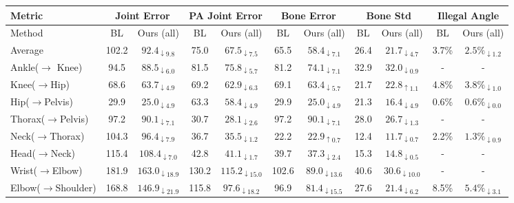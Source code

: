 \documentclass[10pt,twocolumn,letterpaper]{article}
\begin{document}
\begin{table*} 
\centering
\small
\begin{tabular}{l|c|c|c|c|c|c|c|c|c|c}
\hline
Metric &  \multicolumn{2}{|c|}{Joint Error} &  \multicolumn{2}{|c|}{PA Joint Error} 	&  \multicolumn{2}{|c|}{Bone Error} 	& \multicolumn{2}{|c|}{Bone Std} & \multicolumn{2}{|c|}{Illegal Angle}\\
\hline
Method & BL& Ours (all)& BL& Ours (all)& BL& Ours (all)& BL& Ours (all)& BL& Ours (all)\\
\hline \hline
Average    	    & 102.2 & $92.4_{\downarrow9.8}$   & 75.0  & $67.5_{\downarrow7.5}$   & 65.5  & $58.4_{\downarrow7.1}$  & 26.4 & $21.7_{\downarrow4.7}$   & 3.7\% & $2.5\%_{\downarrow1.2}$ \\
\hline
Ankle($\rightarrow$ Knee)   & 94.5  & $88.5_{\downarrow6.0}$   & 81.5  & $75.8_{\downarrow5.7}$   & 81.2  & $74.1_{\downarrow7.1}$  & 32.9 & $32.0_{\downarrow0.9}$   & - & - \\
Knee($\rightarrow$Hip)     & 68.6  & $63.7_{\downarrow4.9}$   & 69.2  & $62.9_{\downarrow6.3}$   & 69.1  & $63.4_{\downarrow5.7}$  & 21.7 & $22.8_{\uparrow1.1  }$   & 4.8\% & $3.8\%_{\downarrow1.0}$ \\
Hip($\rightarrow$Pelvis) 	    & 29.9  & $25.0_{\downarrow4.9}$   & 63.3  & $58.4_{\downarrow4.9}$   & 29.9  & $25.0_{\downarrow4.9}$  & 21.3 & $16.4_{\downarrow4.9}$   & 0.6\%     & $0.6\%_{\downarrow0.0}$     \\
Thorax($\rightarrow$Pelvis)   & 97.2  & $90.1_{\downarrow7.1}$   & 30.7  & $28.1_{\downarrow2.6}$   & 97.2  & $90.1_{\downarrow7.1}$  & 28.0 & $26.7_{\downarrow1.3}$   & -     & -     \\
Neck($\rightarrow$Thorax)     & 104.3 & $96.4_{\downarrow7.9}$   & 36.7  & $35.5_{\downarrow1.2}$   & 22.2  & $22.9_{\uparrow0.7  }$  & 12.4 & $11.7_{\downarrow0.7}$   & 2.2\%     & $1.3\%_{\downarrow0.9}$     \\
Head($\rightarrow$Neck)  & 115.4 & $108.4_{\downarrow7.0}$  & 42.8  & $41.1_{\downarrow1.7}$   & 39.7  & $37.3_{\downarrow2.4}$  & 15.3 & $14.8_{\downarrow0.5}$   & - & - \\
Wrist($\rightarrow$Elbow)     & 181.9 & $163.0_{\downarrow18.9}$ & 130.2 & $115.2_{\downarrow15.0}$ & 102.6 & $89.0_{\downarrow13.6}$ & 40.6 & $30.6_{\downarrow10.0}$  & - & - \\
Elbow($\rightarrow$Shoulder)  & 168.8 & $146.9_{\downarrow21.9}$ & 115.8 & $97.6_{\downarrow18.2}$  & 96.9  & $81.4_{\downarrow15.5}$ & 27.6 & $21.4_{\downarrow6.2}$   & 8.5\% & $5.4\%_{\downarrow3.1}$ \\

\end{tabular}
\end{table*}
\end{document}
